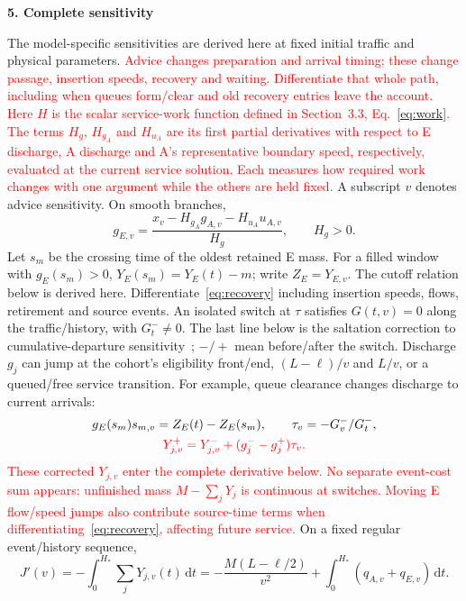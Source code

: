 \documentclass[10pt,a4paper]{article}
\newcommand{\dd}{\,\mathrm d}
\newcommand{\head}[1]{\par\vspace{4pt}\noindent\textbf{#1}\par\nobreak\vspace{1pt}}
\newcommand{\rev}[1]{\textcolor{red}{#1}}
\begin{document}
\newpage
\head{5. Complete sensitivity}
The model-specific sensitivities are derived here at fixed initial traffic
and physical parameters.
\rev{Advice changes preparation and arrival timing; these change passage,
insertion speeds, recovery and waiting. Differentiate that whole path,
including when queues form/clear and old recovery entries leave the account.}
\rev{Here $H$ is the scalar service-work function defined in Section~3.3,
Eq.~\eqref{eq:work}. The terms $H_g$, $H_{g_A}$ and $H_{u_A}$ are its first
partial derivatives with respect to E discharge, A discharge and A's
representative boundary speed, respectively, evaluated at the current
service solution. Each measures how required work changes with one argument
while the others are held fixed.}
A subscript $v$ denotes advice sensitivity. On smooth branches,
\begin{equation}
 g_{E,v}=\frac{x_v-H_{g_A}g_{A,v}-H_{u_A}u_{A,v}}{H_g},\qquad H_g>0.
 \label{eq:rootgradient}
\end{equation}
\begingroup\color{red}
Let $s_m$ be the crossing time of the oldest retained E mass. For a filled
window with $g_E(s_m)>0$, $Y_E(s_m)=Y_E(t)-m$; write $Z_E=Y_{E,v}$.
The cutoff relation below is derived here. Differentiate~\eqref{eq:recovery}
including insertion speeds, flows, retirement and source events.
An isolated switch at $\tau$ satisfies $G(t,v)=0$ along the traffic/history,
with $G_t^-\ne0$. The last line below is the saltation correction to
cumulative-departure sensitivity~\cite{kong}; $-/+$ mean before/after the switch.
Discharge $g_j$ can jump at the cohort's eligibility front/end,
$(L-\ell)/v$ and $L/v$, or a queued/free service transition.
For example, queue clearance changes discharge to current arrivals:
\endgroup
\begin{equation}
 \begin{gathered}
 g_E(s_m)s_{m,v}=Z_E(t)-Z_E(s_m),\qquad \tau_v=-G_v^-/G_t^-,\\
 \rev{Y_{j,v}^+=Y_{j,v}^-+(g_j^- -g_j^+)\tau_v.}
 \end{gathered}
 \label{eq:eventgradient}
\end{equation}
\rev{These corrected $Y_{j,v}$ enter the complete derivative below.
No separate event-cost sum appears: unfinished mass $M-\sum_jY_j$ is
continuous at switches. Moving E flow/speed jumps also contribute source-time
terms when differentiating~\eqref{eq:recovery}, affecting future service.}
On a fixed regular event/history sequence,
\begin{equation}
 J'(v)=-\int_0^{H_*}\!\sum_jY_{j,v}(t)\dd t
 =-\frac{M(L-\ell/2)}{v^2}+\int_0^{H_*}(q_{A,v}+q_{E,v})\dd t.
 \label{eq:objectivegradient}
\end{equation}
\end{document}
